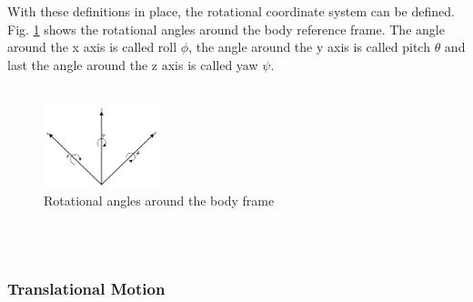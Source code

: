\\\\
With these definitions in place, the rotational coordinate system can be defined. Fig. \ref{fig:quadAngles} shows the rotational angles around the body reference frame. The angle around the x axis is called roll $\phi$, the angle around the y axis is called pitch $\theta$ and last the angle around the z axis is called yaw $\psi$.
\\\\
\begin{figure}[H]
    \centering
    \includegraphics[width = 0.3\textwidth]{VAPIQ-PICTURES/RPJ.jpg}
    \caption{Rotational angles around the body frame}
    \label{fig:quadAngles}
\end{figure}
\\\\
 
\subsubsection{Translational Motion}

